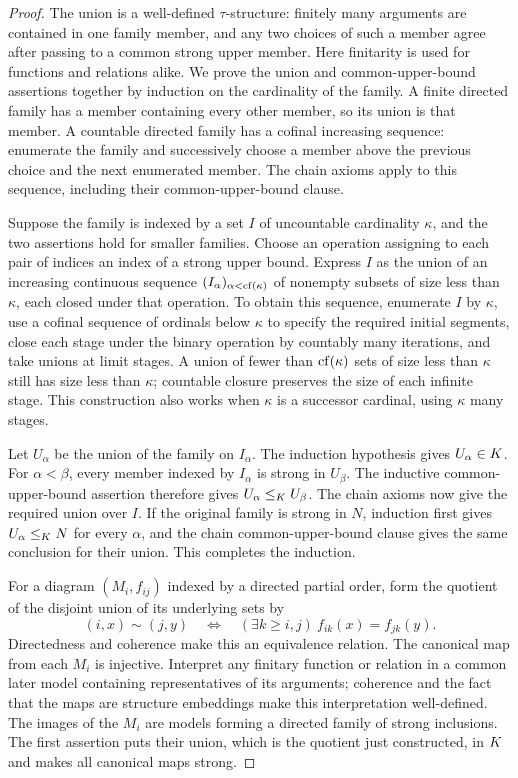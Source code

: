 \begin{proof}
The union is a well-defined $\tau$-structure: finitely many
arguments are contained in one family member, and any two
choices of such a member agree after passing to a common
strong upper member. Here finitarity is used for functions
and relations alike.
We prove the union and common-upper-bound assertions together by
induction on the cardinality of the family. A finite directed
family has a member containing every other member, so its union is
that member. A countable directed family has a cofinal increasing
sequence: enumerate the family and successively choose a member
above the previous choice and the next enumerated member. The
chain axioms apply to this sequence, including their
common-upper-bound clause.

Suppose the family is indexed by a set $I$ of uncountable
cardinality $\kappa$, and the two assertions hold for smaller
families. Choose an operation assigning to each pair of indices
an index of a strong upper bound. Express $I$ as the union of an
increasing continuous sequence $(I_\alpha)_{\alpha<\operatorname{cf}(\kappa)}$
of nonempty subsets of size less than $\kappa$, each closed under
that operation. To obtain this sequence, enumerate $I$ by
$\kappa$, use a cofinal sequence of ordinals below $\kappa$
to specify the required initial segments, close each stage
under the binary operation by countably many iterations, and
take unions at limit stages. A union of fewer than
$\operatorname{cf}(\kappa)$ sets of size less than $\kappa$ still has size
less than $\kappa$; countable closure preserves the size of
each infinite stage. This construction also works when
$\kappa$ is a successor cardinal, using $\kappa$ many stages.

Let $U_\alpha$ be the union of the family on $I_\alpha$. The
induction hypothesis gives $U_\alpha\in K$. For $\alpha<\beta$,
every member indexed by $I_\alpha$ is strong in $U_\beta$.
The inductive common-upper-bound assertion therefore gives
$U_\alpha\leq_K U_\beta$. The chain axioms now give the
required union over $I$. If the original family is strong in
$N$, induction first gives $U_\alpha\leq_K N$ for every
$\alpha$, and the chain common-upper-bound clause gives the
same conclusion for their union. This completes the induction.

For a diagram $(M_i,f_{ij})$ indexed by a directed partial order,
form the quotient of the disjoint union of its underlying sets
by
\[
(i,x)\sim(j,y)
\quad\Longleftrightarrow\quad
(\exists k\geq i,j)\ f_{ik}(x)=f_{jk}(y).
\]
Directedness and coherence make this an equivalence relation.
The canonical map from each $M_i$ is injective. Interpret any
finitary function or relation in a common later model containing
representatives of its arguments; coherence and the fact that
the maps are structure embeddings make this interpretation
well-defined. The images of the $M_i$ are models forming a
directed family of strong inclusions. The first assertion puts
their union, which is the quotient just constructed, in $K$
and makes all canonical maps strong.


\end{proof}
